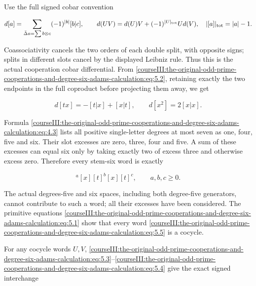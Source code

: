 Use the full signed cobar convention

\begin{equation}
d[a]=\sum_{\bar\Delta a=\sum b\otimes c}(-1)^{|b|}[b|c],
 \qquad d(UV)=d(U)V+(-1)^{|U|_{\rm tot}}U d(V),
 \quad |[a]|_{\rm tot}=|a|-1.
 \label{courseIII:the-original-odd-prime-cooperations-and-degree-six-adams-calculation:eq:5.3}
\end{equation}

Coassociativity cancels the two orders of each double split, with opposite signs; splits in different slots cancel by the displayed Leibniz rule. Thus this is the actual cooperation cobar differential. From \eqref{courseIII:the-original-odd-prime-cooperations-and-degree-six-adams-calculation:eq:5.2}, retaining exactly the two endpoints in the full coproduct before projecting them away, we get

\begin{equation}
d[tx]=-[t|x]+[x|t],\qquad d[x^2]=2[x|x].
 \label{courseIII:the-original-odd-prime-cooperations-and-degree-six-adams-calculation:eq:5.4}
\end{equation}

Formula \eqref{courseIII:the-original-odd-prime-cooperations-and-degree-six-adams-calculation:eq:4.3} lists all positive single-letter degrees at most seven as one, four, five and six. Their slot excesses are zero, three, four and five. A sum of these excesses can equal six only by taking exactly two of excess three and otherwise excess zero. Therefore every stem-six word is exactly

\begin{equation}
[t]^a[x][t]^b[x][t]^c,\qquad a,b,c\geq0.
 \label{courseIII:the-original-odd-prime-cooperations-and-degree-six-adams-calculation:eq:5.5}
\end{equation}

The actual degrees-five and six spaces, including both degree-five generators, cannot contribute to such a word; all their excesses have been considered. The primitive equations \eqref{courseIII:the-original-odd-prime-cooperations-and-degree-six-adams-calculation:eq:5.1} show that every word \eqref{courseIII:the-original-odd-prime-cooperations-and-degree-six-adams-calculation:eq:5.5} is a cocycle.

For any cocycle words \(U,V\), \eqref{courseIII:the-original-odd-prime-cooperations-and-degree-six-adams-calculation:eq:5.3}--\eqref{courseIII:the-original-odd-prime-cooperations-and-degree-six-adams-calculation:eq:5.4} give the exact signed interchange

